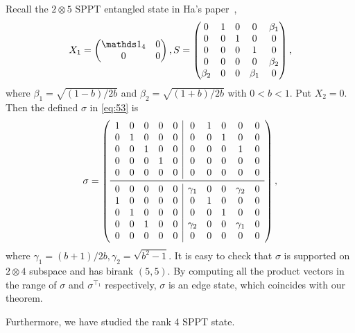   Recall the $2\otimes 5$ SPPT entangled state in Ha's paper~\cite{ha2013separability},
  \begin{equation}
    \label{eq:14}
    X_1 =
    \begin{pmatrix}
      \I_4&0\\
      0&0
    \end{pmatrix}, S =
    \begin{pmatrix}
      0 & 1 & 0 & 0 & \beta_1\\
      0 & 0& 1& 0&0\\
      0 & 0& 0& 1 &0\\
      0 & 0& 0& 0& \beta_2\\
      \beta_2 & 0 & 0&\beta_1 & 0
    \end{pmatrix},
  \end{equation}
  where $\beta_1= \sqrt{(1-b)/2b}$ and $\beta_2 = \sqrt{ (1+b)/2b}$ with $0< b<1$. Put $X_2 = 0$.  Then the defined
  $\sigma $ in \cref{eq:53} is
  \begin{equation}
    \sigma = 
    \left(
    \begin{array}{ccccc|ccccc}
      1 & 0 & 0 & 0 &0   & 0 & 1 &0 & 0&0\\
      0 & 1 & 0 & 0 &0   & 0 & 0 & 1 &0&0\\
      0 & 0 & 1 & 0 &0   & 0 & 0& 0 & 1&0\\
      0 & 0 & 0 & 1 &0   & 0 & 0& 0 & 0&0\\
      0 & 0 & 0 & 0 &0   & 0 & 0& 0 & 0&0\\\midrule
      0 & 0 & 0 & 0 &0   & \gamma_1 & 0& 0 & \gamma_2&0\\
      1 & 0 & 0 & 0 &0   & 0 & 1& 0 & 0&0\\
      0 & 1 & 0 & 0 &0   & 0 & 0& 1 & 0&0\\
      0 & 0 & 1 & 0 &0   & \gamma_2 & 0& 0 & \gamma_1&0\\
      0 & 0 & 0 & 0 &0   & 0 & 0& 0 & 0&0\\
    \end{array}
    \right),
  \end{equation}
  where $\gamma_1 = (b+1)/2b, \gamma_2 = \sqrt{b^2-1}$. It is easy to check that  $\sigma $ is supported on $2\otimes 4$
  subspace and has birank $(5,5)$. By computing all the product vectors in the range of  $\sigma$ and
  $\sigma^{\intercal_1}$ respectively,  $\sigma$ is an edge state, which coincides with our theorem.

  Furthermore, we have studied the rank 4 SPPT state.
  

